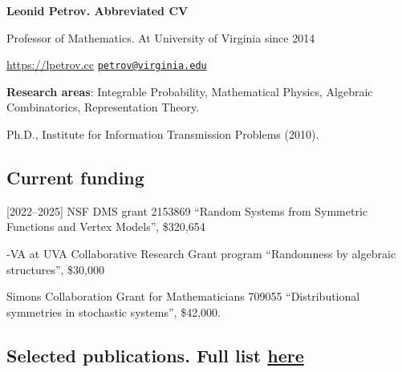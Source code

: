 \documentclass[letterpaper,11pt]{article}
\def\name{Leonid Petrov}
\begin{document}
\centerline{\huge \bf \name . Abbreviated CV}
\bigskip


Professor of Mathematics. At University of Virginia since 2014

\url{https://lpetrov.cc}\hspace{140pt} \href{mailto:petrov@virginia.edu}{\tt petrov@virginia.edu}


\medskip
\textbf{Research areas}: Integrable Probability, Mathematical Physics, Algebraic Combinatorics, Representation
Theory.

\smallskip
Ph.D., 
Institute for Information Transmission Problems (2010).


\subsection*{Current funding}

[2022--2025]
NSF DMS grant 2153869 
``Random Systems from Symmetric Functions and Vertex Models'',
\$320,654

-VA at UVA Collaborative Research Grant program
	``Randomness by algebraic structures'',
	\$30,000

	\smallskip
	 [2020--2025]
		Simons Collaboration Grant for Mathematicians 709055
		``Distributional symmetries in stochastic systems'',
		\$42,000.


\subsection*{Selected publications. Full list \href{https://lpetrov.cc/research/}{here}}
\end{document}
